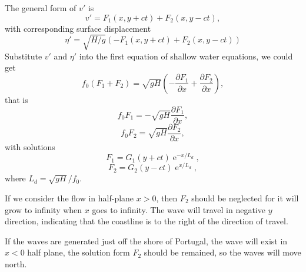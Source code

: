 \documentclass[a4paper]{article}
\begin{document}
\begin{enumerate}[label=\textbf{\arabic*.}]
	The general form  of $v'$ is 
	$$v'=F_1(x,y+ct)+F_2(x,y-ct),$$
	with corresponding surface displacement 
	$$\eta' = \sqrt{H/g}\left(-F_1(x, y+ct)+F_2(x,y-ct)\right)$$
	Substitute $v'$ and $\eta'$ into the first equation of shallow water equations, we could get
	$$f_0(F_1+F_2)=\sqrt{gH}\left(-\frac{\partial F_1}{\partial x}+\frac{\partial F_2}{\partial x}\right),$$
	that is
		$$f_0F_1=-\sqrt{gH}\frac{\partial F_1}{\partial x},$$
		$$f_0F_2=\sqrt{gH}\frac{\partial F_2}{\partial x},$$
	with solutions
	$$F_1 = G_1(y+ct)\operatorname{e}^{-x/L_d},$$
	$$F_2 = G_2(y-ct)\operatorname{e}^{x/L_d},$$
	where $L_d=\sqrt{gH}/f_0.$
	
	If we consider the flow in half-plane $x>0$, then $F_2$ should be neglected for it will grow to infinity when $x$ goes to infinity. The wave will travel in negative $y$ direction, indicating that the coastline is to the right of the direction of travel.
	
	If the waves are generated just off the shore of Portugal, the wave will exist in $x<0$ half plane, the solution form $F_2$ should be remained, so the waves will move north.
	

\end{enumerate}
\end{document}
